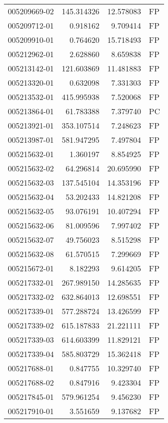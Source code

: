 \begin{tabular}{lrrl}
005209669-02 &  145.314326 &    12.578083 &   FP \\
005209712-01 &    0.918162 &     9.709414 &   FP \\
005209910-01 &    0.764620 &    15.718493 &   FP \\
005212962-01 &    2.628860 &     8.659838 &   FP \\
005213142-01 &  121.603869 &    11.481883 &   FP \\
005213320-01 &    0.632098 &     7.331303 &   FP \\
005213532-01 &  415.995938 &     7.520068 &   FP \\
005213864-01 &   61.783388 &     7.379740 &   PC \\
005213921-01 &  353.107514 &     7.248623 &   FP \\
005213987-01 &  581.947295 &     7.497804 &   FP \\
005215632-01 &    1.360197 &     8.854925 &   FP \\
005215632-02 &   64.296814 &    20.695990 &   FP \\
005215632-03 &  137.545104 &    14.353196 &   FP \\
005215632-04 &   53.202433 &    14.821208 &   FP \\
005215632-05 &   93.076191 &    10.407294 &   FP \\
005215632-06 &   81.009596 &     7.997402 &   FP \\
005215632-07 &   49.756023 &     8.515298 &   FP \\
005215632-08 &   61.570515 &     7.299669 &   FP \\
005215672-01 &    8.182293 &     9.614205 &   FP \\
005217332-01 &  267.989150 &    14.285635 &   FP \\
005217332-02 &  632.864013 &    12.698551 &   FP \\
005217339-01 &  577.288724 &    13.426599 &   FP \\
005217339-02 &  615.187833 &    21.221111 &   FP \\
005217339-03 &  614.603399 &    11.829121 &   FP \\
005217339-04 &  585.803729 &    15.362418 &   FP \\
005217688-01 &    0.847755 &    10.329740 &   FP \\
005217688-02 &    0.847916 &     9.423304 &   FP \\
005217845-01 &  579.961254 &     9.456230 &   FP \\
005217910-01 &    3.551659 &     9.137682 &   FP \\

\end{tabular}
